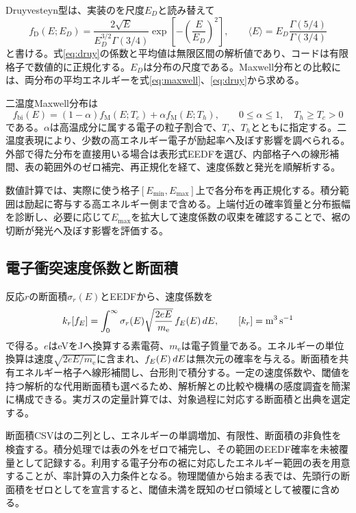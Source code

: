 Druyvesteyn型は、実装のを尺度$E_D$と読み替えて
\begin{equation}
f_{\mathrm D}(E;E_D)=\frac{2\sqrt E}{E_D^{3/2}\Gamma(3/4)}
\exp\!\left[-\left(\frac E{E_D}\right)^2\right],\qquad
\langle E\rangle=E_D\frac{\Gamma(5/4)}{\Gamma(3/4)}
\label{eq:druy}
\end{equation}
と書ける。式\eqref{eq:druy}の係数と平均値は無限区間の解析値であり、コードは有限格子で数値的に正規化する。$E_D$は分布の尺度である。Maxwell分布との比較には、両分布の平均エネルギーを式\eqref{eq:maxwell}、\eqref{eq:druy}から求める。

二温度Maxwell分布は
\begin{equation}
f_{\mathrm{bi}}(E)=(1-\alpha)f_{\mathrm M}(E;T_c)+\alpha f_{\mathrm M}(E;T_h),
\qquad 0\leq\alpha\leq1,\quad T_h\geq T_c>0
\label{eq:bimax}
\end{equation}
である。$\alpha$は高温成分に属する電子の粒子割合で、$T_c$、$T_h$とともに指定する。二温度表現により、少数の高エネルギー電子が励起率へ及ぼす影響を調べられる。外部で得た分布を直接用いる場合は表形式EEDFを選び、内部格子への線形補間、表の範囲外のゼロ補完、再正規化を経て、速度係数と発光を順解析する。

数値計算では、実際に使う格子$[E_{\min},E_{\max}]$上で各分布を再正規化する。積分範囲は励起に寄与する高エネルギー側まで含める。上端付近の確率質量と分布振幅を診断し、必要に応じて$E_{\max}$を拡大して速度係数の収束を確認することで、裾の切断が発光へ及ぼす影響を評価する。

\subsection{電子衝突速度係数と断面積}
反応$r$の断面積$\sigma_r(E)$とEEDFから、速度係数を
\begin{equation}
k_r[f_E]=\int_0^\infty \sigma_r(E)\sqrt{\frac{2eE}{m_{\mathrm e}}}\,f_E(E)\,dE,
\qquad [k_r]=\mathrm{m^3\,s^{-1}}
\label{eq:rate}
\end{equation}
で得る。$e$はeVをJへ換算する素電荷、$m_{\mathrm e}$は電子質量である。エネルギーの単位換算は速度$\sqrt{2eE/m_{\mathrm e}}$に含まれ、$f_E(E)\,dE$は無次元の確率を与える。断面積を共有エネルギー格子へ線形補間し、台形則で積分する。一定の速度係数や、閾値を持つ解析的な代用断面積も選べるため、解析解との比較や機構の感度調査を簡潔に構成できる。実ガスの定量計算では、対象過程に対応する断面積と出典を選定する。

断面積CSVはの二列とし、エネルギーの単調増加、有限性、断面積の非負性を検査する。積分処理では表の外をゼロで補完し、その範囲のEEDF確率を未被覆量として記録する。利用する電子分布の裾に対応したエネルギー範囲の表を用意することが、率計算の入力条件となる。物理閾値から始まる表では、先頭行の断面積をゼロとしてを宣言すると、閾値未満を既知のゼロ領域として被覆に含める。

